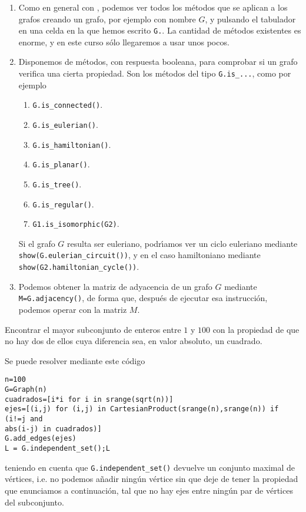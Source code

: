 \begin{enumerate}
\begin{enumerate}
 \item Como en general con {\sage}, podemos ver todos los m\'etodos que se 
aplican a los grafos creando un grafo, por ejemplo con nombre $G$, y pulsando 
el tabulador en una celda en la que hemos escrito \lstinline|G.|. La cantidad 
de m\'etodos existentes es enorme, y en este curso s\'olo llegaremos a usar 
unos pocos. 
 
 \item Disponemos de m\'etodos, con respuesta booleana, para comprobar si un 
grafo verifica una cierta propiedad. Son los m\'etodos del tipo 
\lstinline|G.is_...|, como por ejemplo
\begin{enumerate}
\item \lstinline|G.is_connected()|.
\item \lstinline|G.is_eulerian()|.
\item \lstinline|G.is_hamiltonian()|.
\item \lstinline|G.is_planar()|.
\item \lstinline|G.is_tree()|.
\item \lstinline|G.is_regular()|.
\item \lstinline|G1.is_isomorphic(G2)|.
\end{enumerate}

Si el grafo $G$ resulta ser euleriano, podr\'{\i}amos ver un ciclo euleriano 
mediante \lstinline|show(G.eulerian_circuit())|, y en el caso hamiltoniano 
mediante \lstinline|show(G2.hamiltonian_cycle())|.

\item Podemos obtener la matriz de adyacencia de un grafo $G$ mediante 
\lstinline|M=G.adjacency()|, de forma  que, despu\'es de ejecutar esa 
instrucci\'on,  podemos operar con la matriz $M$.
 
\end{enumerate}
\end{enumerate}

\begin{ejem}
 Encontrar el mayor subconjunto de enteros entre $1$ y $100$ con la propiedad 
de que no hay dos de ellos cuya diferencia sea, en valor absoluto, un cuadrado. 
 
 
 Se puede resolver mediante este c\'odigo
 
 
 \begin{lstlisting}
n=100
G=Graph(n)
cuadrados=[i*i for i in srange(sqrt(n))]
ejes=[(i,j) for (i,j) in CartesianProduct(srange(n),srange(n)) if (i!=j and 
abs(i-j) in cuadrados)]
G.add_edges(ejes)
L = G.independent_set();L
 \end{lstlisting}
 
 \noindent teniendo en cuenta que \lstinline|G.independent_set()| devuelve un 
conjunto maximal de v\'ertices, i.e. no podemos a\~nadir ning\'un v\'ertice sin que deje de 
tener la propiedad que enunciamos a continuaci\'on,   tal que no hay ejes entre ning\'un par de v\'ertices del 
subconjunto. 

\end{ejem}
